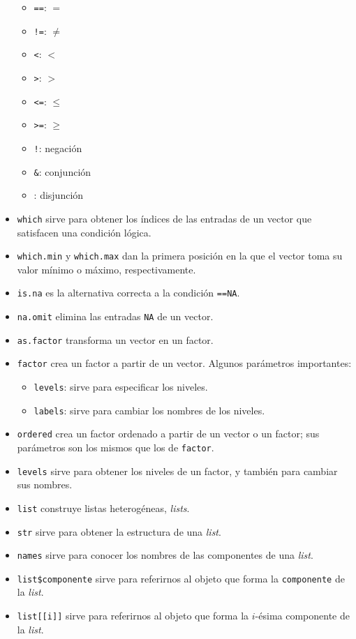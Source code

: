 \documentclass[]{book}
\providecommand{\tightlist}{%
  \setlength{\itemsep}{0pt}\setlength{\parskip}{0pt}}
\theoremstyle{definition}
\theoremstyle{definition}
\theoremstyle{definition}
\theoremstyle{remark}
\begin{document}
\begin{itemize}
  \begin{itemize}
  \tightlist
  \item
    \texttt{==}: \(=\)
  \item
    \texttt{!=}: \(\neq\)
  \item
    \texttt{\textless{}}: \(<\)
  \item
    \texttt{\textgreater{}}: \(>\)
  \item
    \texttt{\textless{}=}: \(\leqslant\)
  \item
    \texttt{\textgreater{}=}: \(\geqslant\)
  \item
    \texttt{!}: negación
  \item
    \texttt{\&}: conjunción
  \item
    \texttt{\textbar{}}: disjunción
  \end{itemize}
\item
  \texttt{which} sirve para obtener los índices de las entradas de un vector que satisfacen una condición lógica.
\item
  \texttt{which.min} y \texttt{which.max} dan la primera posición en la que el vector toma su valor mínimo o máximo, respectivamente.
\item
  \texttt{is.na} es la alternativa correcta a la condición \texttt{==NA}.
\item
  \texttt{na.omit} elimina las entradas \texttt{NA} de un vector.
\item
  \texttt{as.factor} transforma un vector en un factor.
\item
  \texttt{factor} crea un factor a partir de un vector. Algunos parámetros importantes:

  \begin{itemize}
  \tightlist
  \item
    \texttt{levels}: sirve para especificar los niveles.
  \item
    \texttt{labels}: sirve para cambiar los nombres de los niveles.
  \end{itemize}
\item
  \texttt{ordered} crea un factor ordenado a partir de un vector o un factor; sus parámetros son los mismos que los de \texttt{factor}.
\item
  \texttt{levels} sirve para obtener los niveles de un factor, y también para cambiar sus nombres.
\item
  \texttt{list} construye listas heterogéneas, \emph{lists}.
\item
  \texttt{str} sirve para obtener la estructura de una \emph{list}.
\item
  \texttt{names} sirve para conocer los nombres de las componentes de una \emph{list}.
\item
  \texttt{list\$componente} sirve para referirnos al objeto que forma la \texttt{componente} de la \emph{list}.
\item
  \texttt{list{[}{[}i{]}{]}} sirve para referirnos al objeto que forma la \(i\)-ésima componente de la \emph{list}.
\end{itemize}
\end{document}
